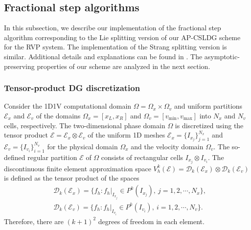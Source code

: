 \documentclass[letterpaper,10pt]{article}
\numberwithin{equation}{section}
\numberwithin{figure}{section}
\numberwithin{table}{section}
\begin{document}
\subsection{Fractional step algorithms}\label{sec:algorithm}
\hspace{4pt}
In this subsection, we describe our implementation of
the fractional step algorithm 
corresponding to the Lie splitting
version of our AP-CSLDG scheme for the RVP system.
The implementation
of the Strang splitting version is similar.
Additional details and explanations can be found in \cite{QIU2011DG}.
The asymptotic-preserving properties of our scheme are analyzed in the next section.

\subsubsection{Tensor-product DG discretization}
\hspace{4pt}
Consider the 1D1V computational domain $\Omega=\Omega_x\times\Omega_v$ and uniform partitions $\mathcal{E}_x$ and $\mathcal{E}_v$ of the domains $\Omega_x=[x_L,x_R]$ and $\Omega_v=[v_{\text{min}},v_{\text{max}}]$ into $N_x$ and $N_v$ cells, respectively. The two-dimensional phase domain $\Omega$ is discretized using the tensor product $\mathcal{E}=\mathcal{E}_x\otimes \mathcal{E}_v$ of the uniform 1D meshes $\mathcal{E}_x=\{I_{x_j}\}_{j=1}^{N_x}$ and $ \mathcal{E}_v=\{I_{v_i}\}_{i=1}^{N_v}$ for the physical domain $\Omega_x$ and the velocity domain 
$\Omega_v$. The so-defined regular partition $\mathcal{E}$ of 
$\Omega$ consists of rectangular cells $I_{x_j}\otimes I_{v_i}$. The
discontinuous
finite element approximation space $V_h^k(\mathcal{E})=\mathcal{D}_k(\mathcal{E}_x)\otimes \mathcal{D}_k(\mathcal{E}_v)$ is defined as the tensor product of the
spaces
\begin{align*}
    &\mathcal{D}_k(\mathcal{E}_x) = \{f_h:f_h|_{I_{x_j}}\in P^k(I_{x_j}),~j=1,2,\cdots,N_x\},\\
    &\mathcal{D}_k(\mathcal{E}_v) = \{f_h:f_h|_{I_{v_i}}\in P^k(I_{v_i}),~i=1,2,\cdots,N_v\}. 
\end{align*}
Therefore, there are $(k+1)^2$ degrees of freedom in each element.
\end{document}
